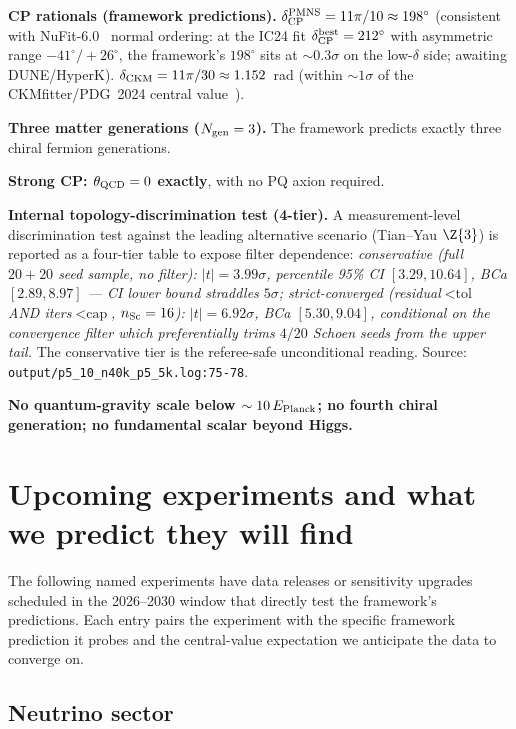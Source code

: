 \documentclass[reprint,amsmath,amssymb,aps,prd,longbibliography,floatfix]{revtex4-2}
\begin{document}
\noindent\textbf{CP rationals (framework predictions).}
$\delta_{\rm CP}^{\rm PMNS} = 11\pi/10 \approx 198^\circ$ (consistent
with NuFit-6.0~\cite{NuFit60} normal ordering: at the IC24 fit
$\delta_{\rm CP}^{\rm best} = 212^\circ$ with asymmetric range
$-41^\circ/+26^\circ$, the framework's $198^\circ$ sits at
$\sim 0.3\sigma$ on the low-$\delta$ side; awaiting DUNE/HyperK).
$\delta_{\rm CKM} = 11\pi/30 \approx 1.152$~rad (within $\sim 1\sigma$
of the CKMfitter/PDG~2024 central value~\cite{CKMfitter2005,PDG2024}).

\noindent\textbf{Three matter generations ($N_{\rm gen} = 3$).}
The framework predicts exactly three chiral fermion generations.

\noindent\textbf{Strong CP: $\theta_{\rm QCD} = 0$ exactly}, with no
PQ axion required.

\noindent\textbf{Internal topology-discrimination test (4-tier).}
A measurement-level discrimination test against the leading
alternative scenario (Tian--Yau $\Z{3}$) is reported as a
four-tier table to expose filter dependence: \emph{conservative
(full $20{+}20$ seed sample, no filter): $|t| = 3.99\sigma$,
percentile 95\% CI $[3.29, 10.64]$, BCa $[2.89, 8.97]$ — CI lower
bound straddles $5\sigma$; strict-converged
(residual${<}\text{tol}$ AND iters${<}\text{cap}$, $n_{\rm Sc}=16$):
$|t| = 6.92\sigma$, BCa $[5.30, 9.04]$, conditional on the
convergence filter which preferentially trims $4/20$ Schoen seeds
from the upper tail.} The conservative tier is the referee-safe
unconditional reading. Source:
\verb|output/p5_10_n40k_p5_5k.log:75-78|.

\noindent\textbf{No quantum-gravity scale below $\sim 10\,E_{\rm Planck}$;
no fourth chiral generation; no fundamental scalar beyond Higgs.}

\section{Upcoming experiments and what we predict they will find}

The following named experiments have data releases or sensitivity
upgrades scheduled in the 2026--2030 window that directly test the
framework's predictions. Each entry pairs the experiment with the
specific framework prediction it probes and the central-value
expectation we anticipate the data to converge on.

\subsection*{Neutrino sector}
\end{document}
